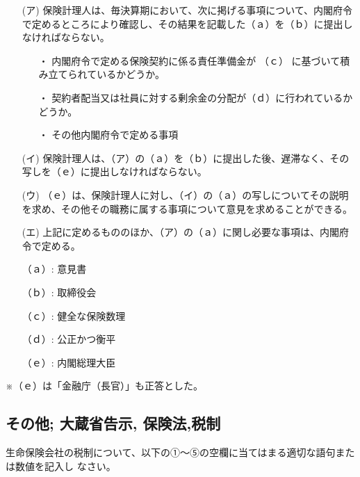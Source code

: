 \documentclass[report,gutter=10mm,fore-edge=10mm,uplatex,dvipdfmx]{jlreq}
\begin{document}
\begin{itemize}
\item[(ア)] 保険計理人は、毎決算期において、次に掲げる事項について、内閣府令で定めるところにより確認し、その結果を記載した（ａ）を（ｂ）に提出しなければならない。
\begin{itemize}
\item[・]  内閣府令で定める保険契約に係る責任準備金が （ｃ） に基づいて積み立てられているかどうか。
\item[・]  契約者配当又は社員に対する剰余金の分配が（ｄ）に行われているかどうか。
\item[・]  その他内閣府令で定める事項
\end{itemize}
\item[(イ)] 保険計理人は、（ア）の（ａ）を（ｂ）に提出した後、遅滞なく、その写しを（ｅ）に提出しなければならない。
\item[(ウ)] （ｅ）は、保険計理人に対し、（イ）の（ａ）の写しについてその説明を求め、その他その職務に属する事項について意見を求めることができる。
\item[(エ)] 上記に定めるもののほか、（ア）の（ａ）に関し必要な事項は、内閣府令で定める。
\end{itemize}

\answer{}
\begin{itemize}
\item[ （ａ）: ] 意見書
\item[ （ｂ）: ] 取締役会
\item[ （ｃ）: ] 健全な保険数理
\item[ （ｄ）: ] 公正かつ衡平
\item[ （ｅ）: ] 内閣総理大臣
\end{itemize}
※（ｅ）は「金融庁（長官）」も正答とした。
\subsection{その他; 大蔵省告示, 保険法,税制}

生命保険会社の税制について、以下の①～⑤の空欄に当てはまる適切な語句または数値を記入し
なさい。
\end{document}
